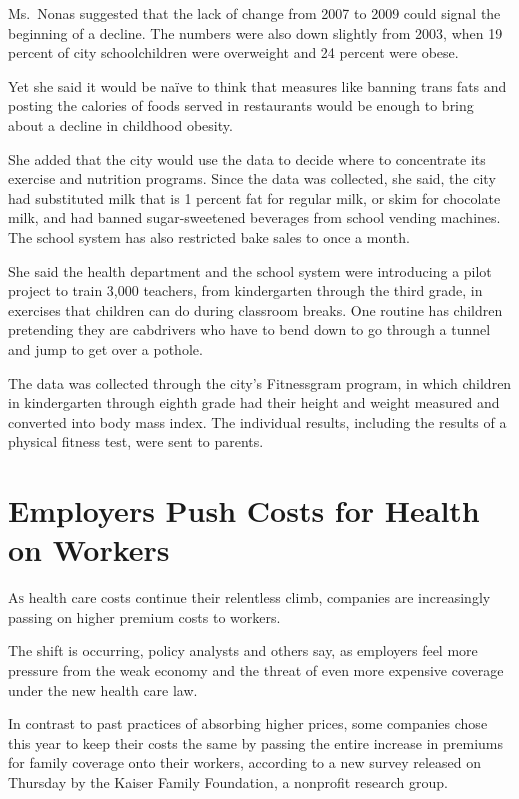﻿\documentclass[12pt]{article}
\begin{document}
Ms.~Nonas suggested that the lack of change from 2007 to 2009 could signal the beginning of a
decline. The numbers were also down slightly from 2003, when 19 percent of city schoolchildren were
overweight and 24 percent were obese.

Yet she said it would be na\"ive to think that measures like banning trans fats and posting the
calories of foods served in restaurants would be enough to bring about a decline in childhood
obesity.

She added that the city would use the data to decide where to concentrate its exercise and nutrition
programs. Since the data was collected, she said, the city had substituted milk that is 1 percent
fat for regular milk, or skim for chocolate milk, and had banned sugar-sweetened beverages from
school vending machines. The school system has also restricted bake sales to once a month.

She said the health department and the school system were introducing a pilot project to train 3,000
teachers, from kindergarten through the third grade, in exercises that children can do during
classroom breaks. One routine has children pretending they are cabdrivers who have to bend down to
go through a tunnel and jump to get over a pothole.

The data was collected through the city's Fitnessgram program, in which children in kindergarten
through eighth grade had their height and weight measured and converted into body mass index. The
individual results, including the results of a physical fitness test, were sent to parents.

\pagebreak
\section{Employers Push Costs for Health on Workers}

\lettrine{A}{s} health care costs continue their relentless climb,
companies are increasingly passing on higher premium costs to workers.

The shift is occurring, policy analysts and others say, as employers feel more pressure from the
weak economy and the threat of even more expensive coverage under the new health care law.

In contrast to past practices of absorbing higher prices, some companies chose this year to keep
their costs the same by passing the entire increase in premiums for family coverage onto their
workers, according to a new survey released on Thursday by the Kaiser Family Foundation, a nonprofit
research group.
\end{document}
